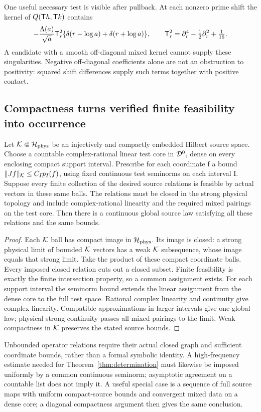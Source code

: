 One useful necessary test is visible after pullback. At
each nonzero prime shift the kernel of $Q(\mathsf T h,\mathsf T k)$
contains
\begin{equation}
-\frac{\Lambda(a)}{\sqrt a}
\mathsf T_r^2\{\delta(r-\log a)+\delta(r+\log a)\},
\qquad \mathsf T_r^2=\partial_r^4-\tfrac12\partial_r^2+\tfrac1{16}.
\end{equation}
A candidate with a smooth off-diagonal mixed kernel cannot
supply these singularities. Negative off-diagonal coefficients
alone are not an obstruction to positivity: squared shift
differences supply such terms together with positive contact.

\subsection{Compactness turns verified finite feasibility into occurrence}
\begin{theorem}\label{thm:compact-occurrence}
Let $\mathcal K\Subset\mathcal H_{\rm phys}$ be an injectively and compactly
embedded Hilbert source space. Choose a countable complex-rational
linear test core in $\mathcal D^0$, dense on every enclosing compact
support interval. Prescribe for each coordinate f a bound
$\lVert Jf\rVert_{\mathcal K}\le C_Ip_I(f)$, using fixed continuous test
seminorms on each interval I. Suppose every finite collection
of the desired source relations is feasible by actual vectors
in these same balls. The relations must be closed in the
strong physical topology and include complex-rational
linearity and the required mixed pairings on the test core.
Then there is a continuous global source law satisfying all
these relations and the same bounds.
\end{theorem}
\begin{proof}
Each $\mathcal K$ ball has compact image in $\mathcal H_{\rm phys}$.
Its image is closed: a strong physical limit of bounded
$\mathcal K$ vectors has a weak $\mathcal K$ subsequence, whose image
equals that strong limit. Take the product of these compact
coordinate balls. Every imposed closed relation cuts out a
closed subset. Finite feasibility is exactly the finite
intersection property, so a common assignment exists.
For each support interval the seminorm bound extends the
linear assignment from the dense core to the full test
space. Rational complex linearity and continuity give
complex linearity. Compatible approximations in larger
intervals give one global law; physical strong continuity
passes all mixed pairings to the limit. Weak compactness
in $\mathcal K$ preserves the stated source bounds.
\end{proof}
Unbounded operator relations require their actual closed
graph and sufficient coordinate bounds, rather than a formal
symbolic identity. A high-frequency estimate needed for
Theorem~\ref{thm:determination} must likewise be imposed
uniformly by a common continuous seminorm; asymptotic
agreement on a countable list does not imply it.
A useful special case is a sequence of full source maps
with uniform compact-source bounds and convergent mixed
data on a dense core; a diagonal compactness argument
then gives the same conclusion.

